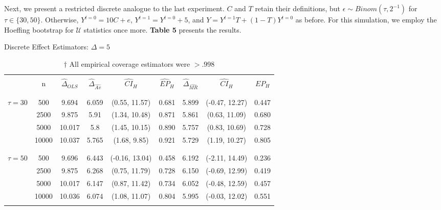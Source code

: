 \documentclass[12pt]{amsart}
\theoremstyle{plain}%
\theoremstyle{definition}
\theoremstyle{remark}
\numberwithin{equation}{section}
\begin{document}
Next, we present a restricted discrete analogue to the last experiment. $C$ and $T$ retain their definitions, but $\epsilon \sim Binom(\tau, 2^{-1})$ for $\tau \in \{30, 50 \}$. Otherwise, $Y^{t=0} = 10C + e$, $Y^{t=1} = Y^{t=0} + 5$, and $Y = Y^{t=1}T + (1-T)Y^{t=0}$ as before. For this simulation, we employ the Hoeffing bootstrap for $\mathcal{U}$ statistics once more. \textbf{Table 5} presents the results.
\begin{table}[H]
\caption{Discrete Effect Estimators: $\Delta =5$}
\centering
\begin{adjustbox}{width=1\textwidth}
\begin{tabular}{ccc|ccc|ccc}
  \hline
   \\[-3.5\smallskipamount]
 & n & $\hat{\Delta}_{OLS}$ & $\hat{\Delta}_{\hat{Av}}$ & $\hat{CI}_H$ & $\hat{EP}_H$ & $\hat{\Delta}_{\hat{MR}}$ & $\hat{CI}_{H}$ & $EP_H$  \\ 
  \\[-3.5\smallskipamount]
  \hline
   \\[-3.5\smallskipamount]
$\tau = 30$ & 500 & 9.694 & 6.059 & (0.55, 11.57) & 0.681 & 5.899 & (-0.47, 12.27) & 0.447 \\ 
   & 2500 & 9.875 & 5.91 & (1.34, 10.48) & 0.871 & 5.861 & (0.63, 11.09) & 0.680 \\ 
   & 5000 & 10.017 & 5.8 & (1.45, 10.15) & 0.890 & 5.757 & (0.83, 10.69) & 0.728 \\ 
   & 10000 & 10.037 & 5.765 & (1.68, 9.85) & 0.921 & 5.729 & (1.19, 10.27) & 0.805 \\ 
     \\[-3.5\smallskipamount]
  \hline
     \\[-3.5\smallskipamount]
 $\tau = 50$  & 500 & 9.696 & 6.443 & (-0.16, 13.04) &  0.458  & 6.192 & (-2.11, 14.49) & 0.236 \\ 
   & 2500 & 9.875 & 6.268 & (0.75, 11.79) & 0.728 & 6.150 & (-0.69, 12.99) & 0.419 \\ 
   & 5000 & 10.017 & 6.147 & (0.87, 11.42) & 0.734 & 6.052 & (-0.48, 12.59) & 0.457 \\ 
   & 10000 & 10.036 & 6.074 & (1.08, 11.07) & 0.804 & 5.995 & (-0.03, 12.02) & 0.551 \\ 
     \\[-3.5\smallskipamount]
   \hline
\end{tabular}
\end{adjustbox}
\caption*{\small $\dagger$ All empirical coverage estimators were $> .998$}
\end{table}
\end{document}
